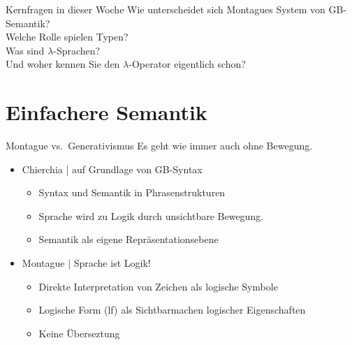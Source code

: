 \begin{frame}
  {Kernfragen in dieser Woche}
  \onslide<+->
  \onslide<+->
  \Large
  \centering
  Wie unterscheidet sich Montagues System von GB-Semantik?\\
  \onslide<+->
  \Halbzeile
  Welche Rolle spielen \alert{Typen}?\\
  \onslide<+->
  \Halbzeile
  Was sind \alert{$\lambda$-Sprachen?}\\
  Und woher kennen Sie den $\lambda$-Operator eigentlich schon?\\
  \onslide<+->
  \Halbzeile
\end{frame}

\section{Einfachere Semantik}

\begin{frame}
  {Montague vs.\ Generativismus}
  \onslide<+->
  \onslide<+->
  Es geht wie immer auch ohne Bewegung.\\
  \Zeile 
  \begin{itemize}[<+->]
    \item Chierchia | auf Grundlage von GB-Syntax
      \begin{itemize}[<+->]
        \item Syntax und \alert{Semantik in Phrasenstrukturen}
        \item Sprache wird zu Logik durch unsichtbare Bewegung.
        \item Semantik als \alert{eigene Repräsentationsebene}
      \end{itemize}
      \Halbzeile
    \item Montague | \alert{Sprache ist Logik!}
      \begin{itemize}[<+->]
        \item Direkte Interpretation von Zeichen als logische Symbole
        \item Logische Form (lf) als \alert{Sichtbarmachen} logischer Eigenschaften
        \item \alert{Keine Überseztung}
      \end{itemize}
  \end{itemize}
\end{frame}

